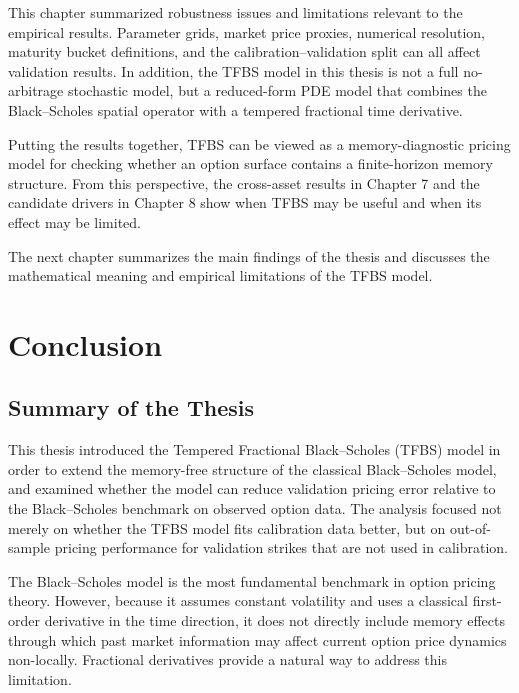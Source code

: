 \documentclass[11pt,a4paper]{report}
\begin{document}
This chapter summarized robustness issues and limitations relevant to the empirical results. Parameter grids, market price proxies, numerical resolution, maturity bucket definitions, and the calibration--validation split can all affect validation results. In addition, the TFBS model in this thesis is not a full no-arbitrage stochastic model, but a reduced-form PDE model that combines the Black--Scholes spatial operator with a tempered fractional time derivative.

Putting the results together, TFBS can be viewed as a memory-diagnostic pricing model for checking whether an option surface contains a finite-horizon memory structure. From this perspective, the cross-asset results in Chapter 7 and the candidate drivers in Chapter 8 show when TFBS may be useful and when its effect may be limited.

The next chapter summarizes the main findings of the thesis and discusses the mathematical meaning and empirical limitations of the TFBS model.

\chapter{Conclusion}

\section{Summary of the Thesis}

This thesis introduced the Tempered Fractional Black--Scholes (TFBS) model in order to extend the memory-free structure of the classical Black--Scholes model, and examined whether the model can reduce validation pricing error relative to the Black--Scholes benchmark on observed option data. The analysis focused not merely on whether the TFBS model fits calibration data better, but on out-of-sample pricing performance for validation strikes that are not used in calibration.

The Black--Scholes model is the most fundamental benchmark in option pricing theory. However, because it assumes constant volatility and uses a classical first-order derivative in the time direction, it does not directly include memory effects through which past market information may affect current option price dynamics non-locally. Fractional derivatives provide a natural way to address this limitation.
\end{document}
